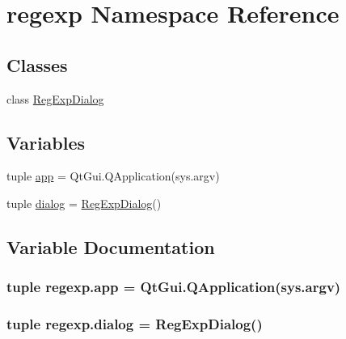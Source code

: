 \hypertarget{namespaceregexp}{}\section{regexp Namespace Reference}
\label{namespaceregexp}
\subsection*{Classes}
\begin{DoxyCompactItemize}
\item 
class \hyperlink{classregexp_1_1RegExpDialog}{Reg\+Exp\+Dialog}
\end{DoxyCompactItemize}
\subsection*{Variables}
\begin{DoxyCompactItemize}
\item 
tuple \hyperlink{namespaceregexp_a249c2597d74e2d80d5d2db98284e9316}{app} = Qt\+Gui.\+Q\+Application(sys.\+argv)
\item 
tuple \hyperlink{namespaceregexp_ab999b0e8dc92621186701c58e9573f73}{dialog} = \hyperlink{classregexp_1_1RegExpDialog}{Reg\+Exp\+Dialog}()
\end{DoxyCompactItemize}


\subsection{Variable Documentation}
\hypertarget{namespaceregexp_a249c2597d74e2d80d5d2db98284e9316}{}
\subsubsection[{app}]{\setlength{\rightskip}{0pt plus 5cm}tuple regexp.\+app = Qt\+Gui.\+Q\+Application(sys.\+argv)}\label{namespaceregexp_a249c2597d74e2d80d5d2db98284e9316}
\hypertarget{namespaceregexp_ab999b0e8dc92621186701c58e9573f73}{}
\subsubsection[{dialog}]{\setlength{\rightskip}{0pt plus 5cm}tuple regexp.\+dialog = {\bf Reg\+Exp\+Dialog}()}\label{namespaceregexp_ab999b0e8dc92621186701c58e9573f73}
